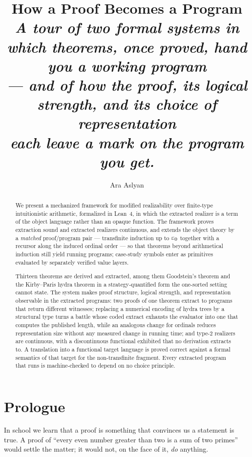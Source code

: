 \documentclass[11pt]{article}
\title{\bfseries How a Proof Becomes a Program\\[6pt]
  \normalfont\large\itshape A tour of two formal systems in which theorems,
  once proved, hand you a working program\\ --- and of how the proof, its
  logical strength, and its choice of representation\\ each leave a mark on
  the program you get.}
\author{Ara Aslyan}
\date{}
\begin{document}
\maketitle
\thispagestyle{empty}

\begin{abstract}
\noindent
We present a mechanized framework for modified realizability over finite-type
intuitionistic arithmetic, formalized in Lean~4, in which the extracted
realizer is a term of the object language rather than an opaque function. The
framework proves extraction sound and extracted realizers continuous, and
extends the object theory by a \emph{matched} proof/program pair --- transfinite
induction up to $\varepsilon_0$ together with a recursor along the induced ordinal
order --- so that theorems beyond arithmetical induction still yield running
programs; case-study symbols enter as primitives evaluated by separately
verified value layers.

Thirteen theorems are derived and extracted, among them Goodstein's theorem and
the Kirby--Paris hydra theorem in a strategy-quantified form the one-sorted
setting cannot state. The system makes proof structure, logical strength, and
representation observable in the extracted programs: two proofs of one theorem
extract to programs that return different witnesses; replacing a numerical
encoding of hydra trees by a structural type turns a battle whose coded extract
exhausts the evaluator into one that computes the published length, while an
analogous change for ordinals reduces representation size without any measured
change in running time; and type-$2$ realizers are continuous, with a
discontinuous functional exhibited that no derivation extracts to. A
translation into a functional target language is proved correct against a
formal semantics of that target for the non-transfinite fragment. Every
extracted program that runs is machine-checked to depend on no choice
principle.
\end{abstract}

\section*{Prologue}

In school we learn that a proof is something that convinces us a statement
is true. A proof of ``every even number greater than two is a sum of two
primes'' would settle the matter; it would not, on the face of it, \emph{do}
anything.
\end{document}
